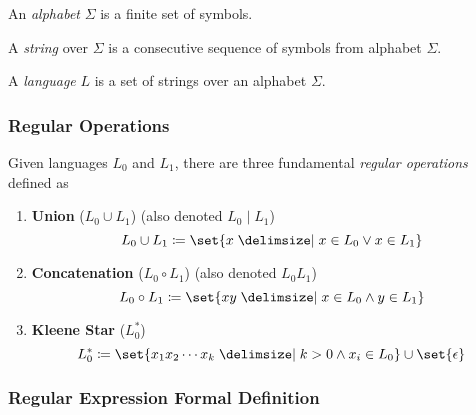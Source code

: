 \begin{definition}[Alphabet]
    An \textit{alphabet} $\Sigma$ is a finite set of symbols.
\end{definition}

\begin{definition}[String]
    A \textit{string} over $\Sigma$ is a consecutive sequence of symbols from alphabet $\Sigma$.
\end{definition}

\begin{definition}[Language]
    A \textit{language} $L$ is a set of strings over an alphabet $\Sigma$.
\end{definition}

\subsubsection{Regular Operations}

\begin{definition}
    Given languages $L_0$ and $L_1$, there are three fundamental \textit{regular operations} defined as
    \begin{enumerate}
        \item \textbf{Union} ($L_0 \cup L_1$) (also denoted $L_0 \mid L_1$)
            \begin{equation}
                L_0 \cup L_1 \coloneqq 
                    \set{ x \given x \in L_0 \lor x \in L_1 }
            \end{equation}
        \item \textbf{Concatenation} ($L_0 \circ L_1$) (also denoted $L_0 L_1$)
            \begin{equation}
                L_0 \circ L_1 \coloneqq
                    \set{ xy \given x \in L_0 \land y \in L_1 }
            \end{equation}
        \item \textbf{Kleene Star} ($L_0^{\ast}$)
            \begin{equation}
                L_0^{\ast} \coloneqq
                    \set{ x_1 x_2 \cdots x_k 
                        \given k > 0 \land x_i \in L_0
                    } \cup \set{ \epsilon }
            \end{equation}
    \end{enumerate}
\end{definition}

\subsubsection{Regular Expression Formal Definition}

